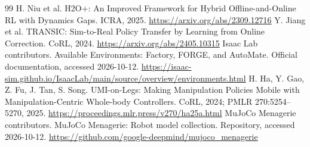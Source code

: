 \documentclass[11pt]{article}
\begin{document}
\begin{thebibliography}{99}
 H. Niu et al. H2O+: An Improved Framework for Hybrid Offline-and-Online RL with Dynamics Gaps. ICRA, 2025. \url{https://arxiv.org/abs/2309.12716}
 Y. Jiang et al. TRANSIC: Sim-to-Real Policy Transfer by Learning from Online Correction. CoRL, 2024. \url{https://arxiv.org/abs/2405.10315}
 Isaac Lab contributors. Available Environments: Factory, FORGE, and AutoMate. Official documentation, accessed 2026-10-12. \url{https://isaac-sim.github.io/IsaacLab/main/source/overview/environments.html}
 H. Ha, Y. Gao, Z. Fu, J. Tan, S. Song. UMI-on-Legs: Making Manipulation Policies Mobile with Manipulation-Centric Whole-body Controllers. CoRL, 2024; PMLR 270:5254--5270, 2025. \url{https://proceedings.mlr.press/v270/ha25a.html}
 MuJoCo Menagerie contributors. MuJoCo Menagerie: Robot model collection. Repository, accessed 2026-10-12. \url{https://github.com/google-deepmind/mujoco_menagerie}
\end{thebibliography}
\end{document}
